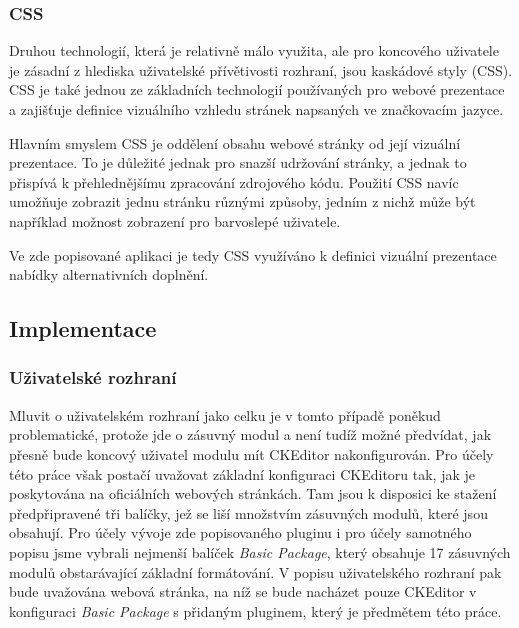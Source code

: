 \documentclass{article}
\begin{document}
\subsubsection{CSS}

Druhou technologií, která je relativně málo využita, ale pro koncového uživatele je zásadní z hlediska uživatelské přívětivosti rozhraní, jsou kaskádové styly (CSS). CSS je také jednou ze základních technologií používaných pro webové prezentace a zajišťuje definice vizuálního vzhledu stránek napsaných ve značkovacím jazyce.

Hlavním smyslem CSS je oddělení obsahu webové stránky od její vizuální prezentace. To je důležité jednak pro snazší udržování stránky, a jednak to přispívá k přehlednějšímu zpracování zdrojového kódu. Použití CSS navíc umožňuje zobrazit jednu stránku různými způsoby, jedním z nichž může být například možnost zobrazení pro barvoslepé uživatele.

Ve zde popisované aplikaci je tedy CSS využíváno k definici vizuální prezentace nabídky alternativních doplnění.

\subsection{Implementace}

\subsubsection{Uživatelské rozhraní}


Mluvit o uživatelském rozhraní jako celku je v tomto případě poněkud problematické, protože jde o zásuvný modul a není tudíž možné předvídat, jak přesně bude koncový uživatel modulu mít CKEditor nakonfigurován. Pro účely této práce však postačí uvažovat základní konfiguraci CKEditoru tak, jak je poskytována na oficiálních webových stránkách. Tam jsou k disposici ke stažení předpřipravené tři balíčky, jež se liší množstvím zásuvných modulů, které jsou obsahují. Pro účely vývoje zde popisovaného pluginu i pro účely samotného popisu jsme vybrali nejmenší balíček {\it Basic Package}, který obsahuje 17 zásuvných modulů obstarávající základní formátování. V popisu uživatelského rozhraní pak bude uvažována webová stránka, na níž se bude nacházet pouze CKEditor v konfiguraci {\it Basic Package} s přidaným pluginem, který je předmětem této práce.
\end{document}
